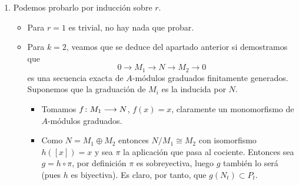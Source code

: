\documentclass[twoside]{article}
\DeclareMathOperator{\Ima}{Im}
\begin{document}
\begin{solucion}
\begin{enumerate}
\begin{proof} Veamos que se verifican las propiedades.
\begin{itemize} 
\item $P_t,N_t$ y $M_t$ son $k$-e.v. de dimensión finita por el Lema \ref{lemma:1}.
\item Las restricciones de $f$ y $g$ a $M_t$ y $N_t$ respectivamente están bien definidas por la hipótesis de que son homomorfismos de $A$-módulos graduados (Ecuación \ref{eq:1}).
\item $f,g$ son homomorfismos de $k$-e.v. por ser homomorfismos de $A$-módulos, luego las restricciones también lo son. Además, $f$ es inyectiva por hipótesis, por lo que $f|_{M_t}$ también lo es. $g|_{N_t}$ es sobreyectiva por el Lema \ref{lemma:2}.
\item Sabemos que $\Ima(f)=\ker g$. Es claro que $\Ima(f|_{M_t})= \Ima(f)\cap N_t$. Una contención es trivial, sea $x\in \Ima(f)\cap N_t$, si no estuviese en $M_t$ podríamos razonar como en el Lema 2. Por definición, $\ker{g|_{N_t}}=\ker g \cap N_t$, luego
$$
\Ima(f|_{M_t})= \Ima(f)\cap N_t =\ker g \cap N_t = \ker{g|_{N_t}}
$$
\end{itemize}
\end{proof}
Una consecuencia inmediata del Lema \ref{lemma:3} es que $P_t \cong N_t/f(M_t)$, luego 
 $$
\dim_k(P_t) = \dim_k(N_t)-\dim_k(f(M_t)) \overset{\text{f inyectiva}}{=} \dim_k(N_t)-\dim_k(M_t)
$$
$$\phi_P(t) = \phi_N(t)-\phi_M(t) \Rightarrow \phi_N(t)=\phi_M(t)+\phi_P(t)$$
\item Podemos probarlo por inducción sobre $r$. 
\begin{itemize}
\item Para $r=1$ es trivial, no hay nada que probar. 
\item Para $k=2$, veamos que se deduce del apartado anterior si demostramos que 
$$
0\to M_1 \to N \to M_2 \to 0$$
es una secuencia exacta de $A$-módulos graduados finitamente generados. Suponemos que la graduación de $M_i$ es la inducida por $N$.
\begin{itemize}
\item Tomamos $f\colon{M_1}\longrightarrow{N}$, $f(x)=x$, claramente un monomorfismo de $A$-módulos graduados. 
\item Como $N=M_1\oplus M_2$ entonces $N/M_1\cong M_2$ con isomorfismo $h([x])=x$ y sea $\pi$ la aplicación que pasa al cociente. Entonces sea $g=h \circ \pi$, por definición $\pi$ es sobreyectiva, luego $g$ también lo será (pues $h$ es biyectiva). Es claro, por tanto, que $g(N_t)\subset P_t$. 



\end{itemize}
\end{itemize}
\end{enumerate}
\end{solucion}
\end{document}
